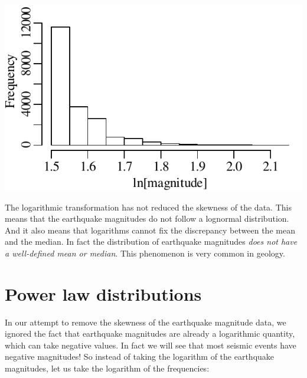 \noindent\begin{minipage}[t][][b]{.4\textwidth}
  \includegraphics[width=\textwidth]{../figures/recentlogquakes.pdf}\medskip
\end{minipage}
\begin{minipage}[t][][t]{.6\textwidth}
  \label{fig:recentlogquakes}
\end{minipage}

The logarithmic transformation has not reduced the skewness of the
data. This means that the earthquake magnitudes do not follow a
lognormal distribution. And it also means that logarithms cannot fix
the discrepancy between the mean and the median. In fact the
distribution of earthquake magnitudes \emph{does not have a
  well-defined mean or median}. This phenomenon is very common in
geology.

\section{Power law distributions}
\label{sec:power-law}

In our attempt to remove the skewness of the earthquake magnitude
data, we ignored the fact that earthquake magnitudes are already a
logarithmic quantity, which can take negative values. In fact we will
see that most seismic events have negative magnitudes!  So instead of
taking the logarithm of the earthquake magnitudes, let us take the
logarithm of the frequencies:

